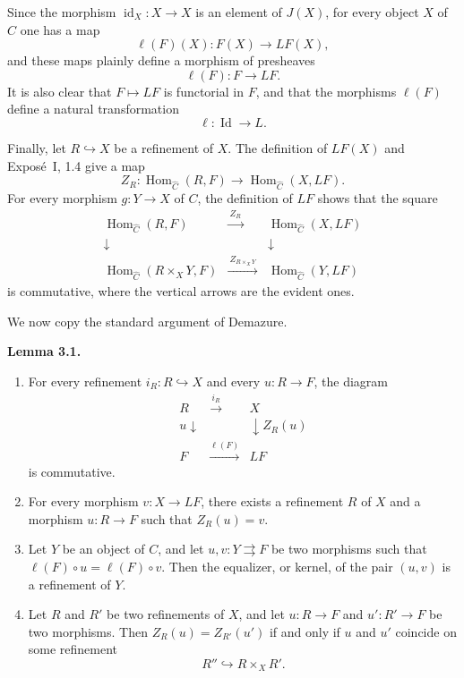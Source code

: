 \documentclass[11pt]{article}
\newcommand{\Hom}{\operatorname{Hom}}
\newcommand{\id}{\operatorname{id}}
\newenvironment{statement}[1]{\par\medskip\noindent\textbf{#1.}\ }{\par\medskip}
\begin{document}
Since the morphism \(\id_X:X\to X\) is an element of \(J(X)\), for every object \(X\) of \(C\) one has a map
\[
\ell(F)(X):F(X)\longrightarrow LF(X),
\]
and these maps plainly define a morphism of presheaves
\[
\ell(F):F\longrightarrow LF.
\]
It is also clear that \(F\mapsto LF\) is functorial in \(F\), and that the morphisms \(\ell(F)\) define a natural transformation
\[
\ell:\operatorname{Id}\longrightarrow L.
\]

Finally, let \(R\hookrightarrow X\) be a refinement of \(X\). The definition of \(LF(X)\) and Expos\'e~I, 1.4 give a map
\[
Z_R:\Hom_{\widehat C}(R,F)\longrightarrow\Hom_{\widehat C}(X,LF).
\]
For every morphism \(g:Y\to X\) of \(C\), the definition of \(LF\) shows that the square
\[
\begin{array}{ccc}
\Hom_{\widehat C}(R,F) & \xrightarrow{\ Z_R\ } & \Hom_{\widehat C}(X,LF)\\
\downarrow && \downarrow\\
\Hom_{\widehat C}(R\times_XY,F) & \xrightarrow{\ Z_{R\times_XY}\ } & \Hom_{\widehat C}(Y,LF)
\end{array}
\tag{*}
\]
is commutative, where the vertical arrows are the evident ones.

We now copy the standard argument of Demazure.

\begin{statement}{Lemma 3.1}
\begin{enumerate}[label=\arabic*)]
\item For every refinement \(i_R:R\hookrightarrow X\) and every \(u:R\to F\), the diagram
\[
\begin{array}{ccc}
R&\xrightarrow{i_R}&X\\
{\scriptstyle u}\downarrow&&\downarrow{\scriptstyle Z_R(u)}\\
F&\xrightarrow{\ell(F)}&LF
\end{array}
\tag{**}
\]
is commutative.

\item For every morphism \(v:X\to LF\), there exists a refinement \(R\) of \(X\) and a morphism \(u:R\to F\) such that \(Z_R(u)=v\).

\item Let \(Y\) be an object of \(C\), and let \(u,v:Y\rightrightarrows F\) be two morphisms such that \(\ell(F)\circ u=\ell(F)\circ v\). Then the equalizer, or kernel, of the pair \((u,v)\) is a refinement of \(Y\).

\item Let \(R\) and \(R'\) be two refinements of \(X\), and let \(u:R\to F\) and \(u':R'\to F\) be two morphisms. Then \(Z_R(u)=Z_{R'}(u')\) if and only if \(u\) and \(u'\) coincide on some refinement
\[
R''\hookrightarrow R\times_XR'.
\]
\end{enumerate}
\end{statement}
\end{document}
